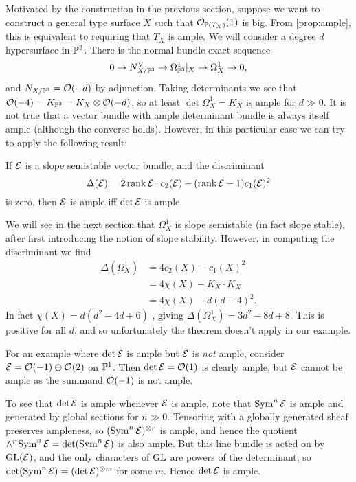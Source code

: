 Motivated by the construction in the previous section, suppose we want to
construct a general type surface $X$ such that $\O_{\P(T_X)}(1)$ is big. From
\cref{prop:ample}, this is equivalent to requiring that $T_X$ is ample. We will
consider a degree $d$ hypersurface in $\P^3$. There is the normal bundle exact
sequence
\begin{equation*}
    0 \to N_{X/\P^3}^\vee \to \Omega^1_{\P^3}|_X \to \Omega^1_X \to 0,
\end{equation*}
and $N_{X/\P^3}=\O(-d)$ by adjunction. Taking determinants we see that
$\O(-4)=K_{\P^3}=K_X\otimes\O(-d)$, so at least $\det\Omega^1_X=K_X$ is ample
for $d\gg0$. It is not true that a vector bundle with ample determinant bundle
is always itself ample (although the converse holds). However, in this
particular case we can try to apply the following result:

\begin{theorem}\label{thm:stable ample}
    If $\calE$ is a slope semistable vector bundle, and the discriminant
    \begin{equation*}
        \Delta(\calE)
            = 2\rank\calE\cdot c_2(\calE) - (\rank\calE-1)c_1(\calE)^2
    \end{equation*}
    is zero, then $\calE$ is ample iff $\det\calE$ is ample.
\end{theorem}

We will see in the next section that $\Omega^1_X$ is slope semistable (in fact
slope stable), after first introducing the notion of slope stability. However,
in computing the discriminant we find
\begin{align*}
    \Delta(\Omega^1_X)
        &= 4c_2(X) - c_1(X)^2 \\
        &= 4\chi(X) - K_X\cdot K_X \\
        &= 4\chi(X) - d(d-4)^2.
\end{align*}
In fact $\chi(X)=d(d^2-4d+6)$ \cite{maxim_24}, giving
$\Delta(\Omega^1_X)=3d^2-8d+8$. This is positive for all $d$, and so
unfortunately the theorem doesn't apply in our example.

\begin{example}
    For an example where $\det\calE$ is ample but $\calE$ is \emph{not} ample,
    consider $\calE=\O(-1)\oplus\O(2)$ on $\P^1$. Then $\det\calE=\O(1)$ is
    clearly ample, but $\calE$ cannot be ample as the summand $\O(-1)$ is not
    ample.
\end{example}

\begin{remark}
    To see that $\det\calE$ is ample whenever $\calE$ is ample, note that
    $\Sym^n\calE$ is ample and generated by global sections for $n\gg0$.
    Tensoring with a globally generated sheaf preserves ampleness, so
    $(\Sym^n\calE)^{\otimes r}$ is ample, and hence the quotient
    $\wedge^r\Sym^n\calE=\det(\Sym^n\calE)$ is also ample. But this line bundle
    is acted on by $\GL(\calE)$, and the only characters of $\GL$ are powers of
    the determinant, so $\det(\Sym^n\calE)=(\det\calE)^{\otimes m}$ for some
    $m$. Hence $\det\calE$ is ample.
\end{remark}

